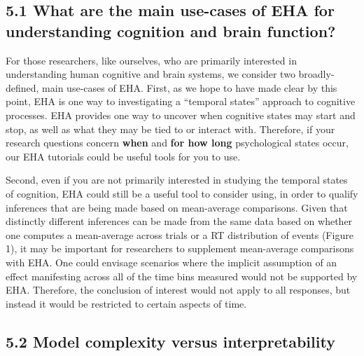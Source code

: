 \documentclass[
  man, donotrepeattitle,floatsintext]{apa6}
\begin{document}
\subsection{5.1 What are the main use-cases of EHA for understanding cognition and brain function?}\label{what-are-the-main-use-cases-of-eha-for-understanding-cognition-and-brain-function}

For those researchers, like ourselves, who are primarily interested in understanding human cognitive and brain systems, we consider two broadly-defined, main use-cases of EHA. First, as we hope to have made clear by this point, EHA is one way to investigating a ``temporal states'' approach to cognitive processes. EHA provides one way to uncover when cognitive states may start and stop, as well as what they may be tied to or interact with. Therefore, if your research questions concern \textbf{when} and \textbf{for how long} psychological states occur, our EHA tutorials could be useful tools for you to use.

Second, even if you are not primarily interested in studying the temporal states of cognition, EHA could still be a useful tool to consider using, in order to qualify inferences that are being made based on mean-average comparisons. Given that distinctly different inferences can be made from the same data based on whether one computes a mean-average across trials or a RT distribution of events (Figure 1), it may be important for researchers to supplement mean-average comparisons with EHA. One could envisage scenarios where the implicit assumption of an effect manifesting across all of the time bins measured would not be supported by EHA. Therefore, the conclusion of interest would not apply to all responses, but instead it would be restricted to certain aspects of time.

\subsection{5.2 Model complexity versus interpretability}\label{model-complexity-versus-interpretability}
\end{document}
